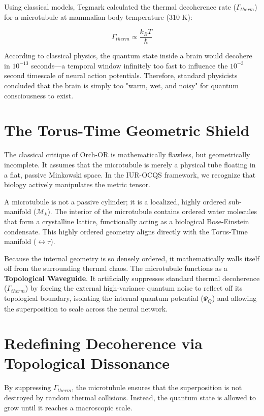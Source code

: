 \documentclass[12pt,openany]{book}
\begin{document}
Using classical models, Tegmark calculated the thermal decoherence rate ($\Gamma_{therm}$) for a microtubule at mammalian body temperature ($310$ K):

\begin{equation}
\Gamma_{therm} \propto \frac{k_B T}{\hbar}
\end{equation}

According to classical physics, the quantum state inside a brain would decohere in $10^{-13}$ seconds---a temporal window infinitely too fast to influence the $10^{-3}$ second timescale of neural action potentials. Therefore, standard physicists concluded that the brain is simply too "warm, wet, and noisy" for quantum consciousness to exist.

\section{The Torus-Time Geometric Shield}
The classical critique of Orch-OR is mathematically flawless, but geometrically incomplete. It assumes that the microtubule is merely a physical tube floating in a flat, passive Minkowski space. In the IUR-OCQS framework, we recognize that biology actively manipulates the metric tensor.

A microtubule is not a passive cylinder; it is a localized, highly ordered sub-manifold ($\mathcal{M}_k$). The interior of the microtubule contains ordered water molecules that form a crystalline lattice, functionally acting as a biological Bose-Einstein condensate. This highly ordered geometry aligns directly with the Torus-Time manifold ($\leftrightarrow\tau$). 

Because the internal geometry is so densely ordered, it mathematically walls itself off from the surrounding thermal chaos. The microtubule functions as a \textbf{Topological Waveguide}. It artificially suppresses standard thermal decoherence ($\Gamma_{therm}$) by forcing the external high-variance quantum noise to reflect off its topological boundary, isolating the internal quantum potential ($\Psi_Q$) and allowing the superposition to scale across the neural network.

\section{Redefining Decoherence via Topological Dissonance}
By suppressing $\Gamma_{therm}$, the microtubule ensures that the superposition is not destroyed by random thermal collisions. Instead, the quantum state is allowed to grow until it reaches a macroscopic scale. 
\end{document}

